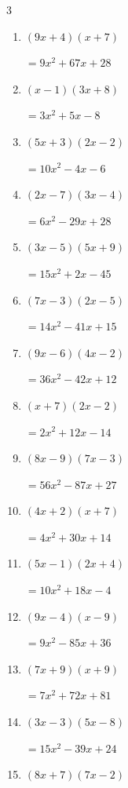 \begin{multicols}{3}
\begin{enumerate}
        $=4x^{2}-2x-30$

\columnbreak %

  \item $(9x+4)(x+7)$

        $=9x^{2}+67x+28$

  \item $(x-1)(3x+8)$

        $=3x^{2}+5x-8$

  \item $(5x+3)(2x-2)$

        $=10x^{2}-4x-6$

  \item $(2x-7)(3x-4)$

        $=6x^{2}-29x+28$

  \item $(3x-5)(5x+9)$

        $=15x^{2}+2x-45$

  \item $(7x-3)(2x-5)$

        $=14x^{2}-41x+15$

  \item $(9x-6)(4x-2)$

        $=36x^{2}-42x+12$

  \item $(x+7)(2x-2)$

        $=2x^{2}+12x-14$

  \item $(8x-9)(7x-3)$

        $=56x^{2}-87x+27$

  \item $(4x+2)(x+7)$

        $=4x^{2}+30x+14$

  \item $(5x-1)(2x+4)$

        $=10x^{2}+18x-4$

  \item $(9x-4)(x-9)$

        $=9x^{2}-85x+36$

  \item $(7x+9)(x+9)$

        $=7x^{2}+72x+81$

  \item $(3x-3)(5x-8)$

        $=15x^{2}-39x+24$

  \item $(8x+7)(7x-2)$


\end{enumerate}
\end{multicols}
